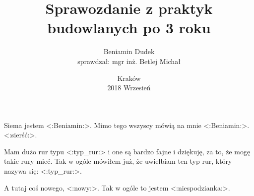 \documentclass[a4paper,11pt,fleqn]{mwart}
\title{Sprawozdanie z praktyk budowlanych po 3 roku}
\date{Kraków\\ 2018 Wrzesień}
\author{Beniamin Dudek \\ sprawdzał: mgr inż. Betlej Michał}
\begin{document}
	\maketitle
	Siema jestem <:Beniamin:>. Mimo tego wszyscy mówią na mnie <:Beniamin:>.
	<:sierść:>.

	Mam dużo rur typu <:typ_rur:> i one są bardzo fajne i dziękuję, za to, że mogę takie rury mieć.
	Tak w ogóle mówiłem już, że uwielbiam ten typ rur, który nazywa się: <:typ_rur:>.

	A tutaj coś nowego, <:nowy:>. Tak w ogóle to jestem <:niespodzianka:>.
\end{document}
